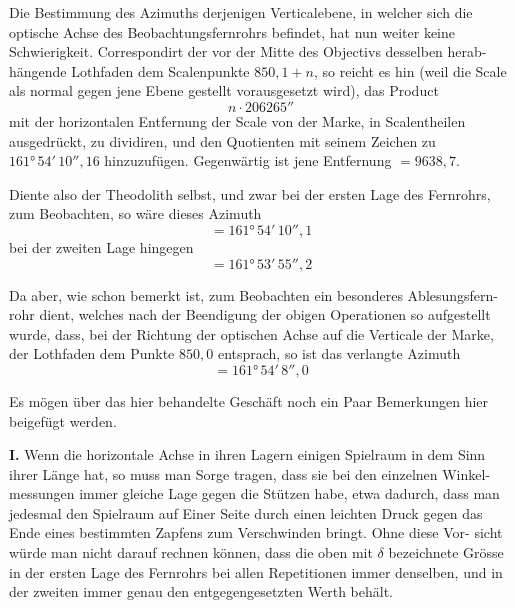 \documentclass[12pt,a4paper]{article}
\begin{document}
Die Bestimmung des Azimuths derjenigen Verticalebene, in welcher sich
die optische Achse des Beobachtungsfernrohrs befindet, hat nun weiter keine
Schwierigkeit. Correspondirt der vor der Mitte des Objectivs desselben herab-
hängende Lothfaden dem Scalenpunkte $850{,}1 + n$, so reicht es hin (weil die
Scale als normal gegen jene Ebene gestellt vorausgesetzt wird), das Product
\[ n \cdot 206265'' \]
mit der horizontalen Entfernung der Scale von der Marke, in Scalentheilen ausgedrückt, zu dividiren, und den Quotienten mit seinem Zeichen zu $161°\,54'\,10''{,}16$ hinzuzufügen. Gegenwärtig ist jene Entfernung $= 9638{,}7$.

Diente also der Theodolith selbst, und zwar bei der ersten Lage des Fernrohrs,
zum Beobachten, so wäre dieses Azimuth
\[ = 161°\,54'\,10''{,}1 \]
bei der zweiten Lage hingegen
\[ = 161°\,53'\,55''{,}2 \]

Da aber, wie schon bemerkt ist, zum Beobachten ein besonderes Ablesungsfern-
rohr dient, welches nach der Beendigung der obigen Operationen so aufgestellt
wurde, dass, bei der Richtung der optischen Achse auf die Verticale der Marke,
der Lothfaden dem Punkte $850{,}0$ entsprach, so ist das verlangte Azimuth
\[ = 161°\,54'\,8''{,}0 \]

Es mögen über das hier behandelte Geschäft noch ein Paar Bemerkungen
hier beigefügt werden.

\textbf{I.} Wenn die horizontale Achse in ihren Lagern einigen Spielraum in dem
Sinn ihrer Länge hat, so muss man Sorge tragen, dass sie bei den einzelnen Winkel-
messungen immer gleiche Lage gegen die Stützen habe, etwa dadurch, dass
man jedesmal den Spielraum auf Einer Seite durch einen leichten Druck gegen
das Ende eines bestimmten Zapfens zum Verschwinden bringt. Ohne diese Vor-
sicht würde man nicht darauf rechnen können, dass die oben mit $\delta$ bezeichnete
Grösse in der ersten Lage des Fernrohrs bei allen Repetitionen immer denselben,
und in der zweiten immer genau den entgegengesetzten Werth behält.
\end{document}
